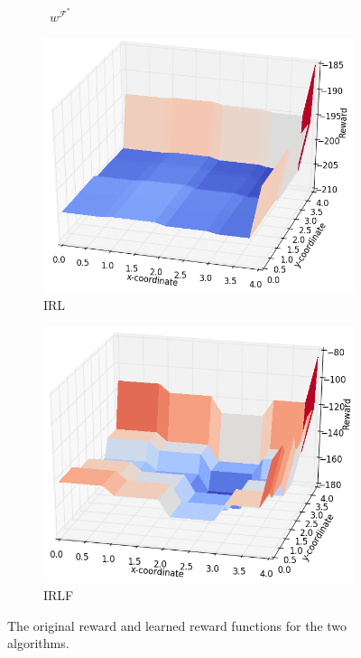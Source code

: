 \documentclass{aamas2016}
\begin{document}
\begin{figure}[t]
\begin{subfigure}[b]{0.51\columnwidth}
    
    \caption{\ $w^{\mathcal{F}^*}$}
    \label{fig:rf_plot_bad}
  \end{subfigure}  
  \label{fig:contrastive}
  \begin{subfigure}[b]{0.51\columnwidth}

    \includegraphics[clip=true,width=\textwidth]{images/RF_IRL.png}
    \caption{IRL}
    \label{fig:rf_plot_irlf}
  \end{subfigure}
  \hfill
  \begin{subfigure}[b]{0.51\columnwidth}
    \includegraphics[clip=true,width=\textwidth]{images/RF_IRLF.png}
    \caption{IRLF}
    \label{fig:rf_plot_irl}
  \end{subfigure}  
  \caption{The original reward and learned reward functions for the two algorithms.\ }
  \label{fig:rf_plot}
\end{figure}
\end{document}
